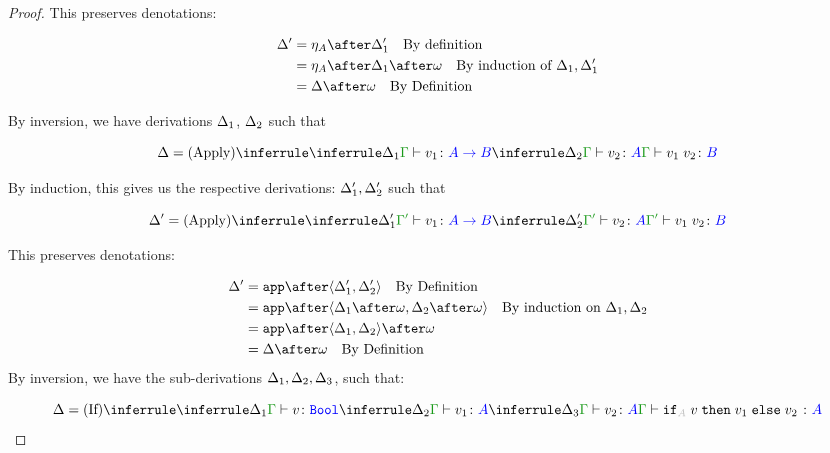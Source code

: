 \documentclass{report}
\begin{document}
\begin{framed}
\begin{proof}
        This preserves denotations:
        
        \begin{align*}
            \D' & = \point{A}\after\D_1' \qt{By definition}\\
                & = \point{A}\after\D_1\after\w\qt{By induction of $\D_1, \D_1'$}\\
                & = \D\after\w\qt{By Definition}
        \end{align*}
        
            By inversion, we have derivations $\Delta_1$, $\Delta_2$ such that
        
            \begin{equation}
                \D = 
                \ntreeruleII{Apply}{
                    \treeruleI{\D_1}{\gtyperelation{v_1}{\ab}}
                    }{
                    \treeruleI{\D_2}{\gtyperelation{v_2}{A}}
                } {
                    \gtyperelation{\apply{v_1}{v_2}}{B}
                }
            \end{equation}
        
            By induction, this gives us the respective derivations: $\Delta_1',\Delta_2'$ such that
        
            
            \begin{equation}
                \D' = 
                \ntreeruleII{Apply}{
                    \treeruleI{\D_1'}{\typerelation{\G'}{v_1}{\ab}}
                    }{
                    \treeruleI{\D_2'}{\typerelation{\G'}{v_2}{A}}
                } {
                    \typerelation{\G'}{\apply{v_1}{v_2}}{B}
                }
            \end{equation}
        
            This preserves denotations:
        
            \begin{align*}
                \D' &= \app\after\pr{\D_1'}{\D_2'} \qt{By Definition}\\
                &= \app\after\pr{\D_1\after\w}{\D_2\after\w} \qt{By induction on $\D_1, \D_2$}\\
                &= \app\after\pr{\D_1}{\D_2}\after\w\\
                &= \D\after\w\qt{By Definition}
            \end{align*}
        By inversion, we have the sub-derivations $\Delta_1,\Delta_2,\Delta_3$, such that:
        
        
        \begin{equation}
            \D = \ntreeruleIII{If}{
                \treeruleI{\D_1}{\typerelation{\G}{v}{\B}}
                }{
                \treeruleI{\D_2}{\typerelation{\G}{v_1}{ A}}
                }{
                \treeruleI{\D_3}{\typerelation{\G}{v_2}{ A}}
            }{
                \typerelation{\G}{\pifthenelse{A}{v}{v_1}{v_2}}{ A}
            }
        \end{equation}
        

\end{proof}
\end{framed}
\end{document}

